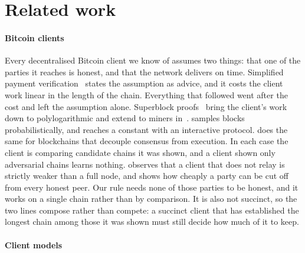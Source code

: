 \section{Related work}
\label{sec.related}

\paragraph{Bitcoin clients}

Every decentralised Bitcoin client we know of assumes two things: that one of
the parties it reaches is honest, and that the network delivers on time.
Simplified payment verification~\cite[Section 8]{nakamoto08} states the
assumption as advice, and it costs the client work linear in the length of the
chain. Everything that followed went after the cost and left the assumption
alone. Superblock proofs~\cite{nipopow} bring
the client's work down to polylogarithmic and extend to miners
in~\cite{logspace}. \cite{flyclient} samples blocks probabilistically, and
\cite{blink} reaches a constant with an interactive protocol.
\cite{lazyclients} does the same for blockchains that decouple consensus from
execution. In each case the client is comparing candidate chains it was shown,
and a client shown only adversarial chains learns nothing. \cite{sz16} observes
that a client that does not relay is strictly weaker than a full node, and
\cite{eclipse} shows how cheaply a party can be cut off from every honest peer.
Our rule needs none of those parties to be honest, and it works on a single
chain rather than by comparison. It is also not succinct, so the two lines
compose rather than compete: a succinct client that has established the longest
chain among those it was shown must still decide how much of it to keep.

\paragraph{Client models}

